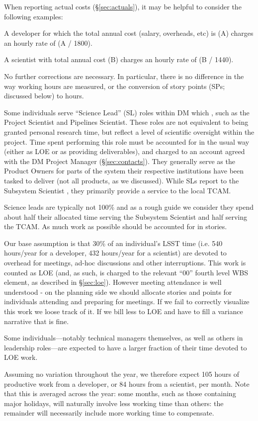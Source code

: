 When reporting actual costs (\S\ref{sec:actuals}), it may
be helpful to consider the following examples:

A developer for which the total annual cost (salary, overheads, etc) is
(A) charges an hourly rate of (A / 1800).

A scientist with total annual cost (B) charges an hourly rate of
(B / 1440).

No further corrections are necessary. In particular, there is no
difference in the way working hours are measured, or the conversion of
story points (SPs; discussed below) to hours.

Some individuals serve ``Science Lead'' (SL) roles within DM which ,
such as the Project Scientist and Pipelines Scientist. These roles are
not equivalent to being granted personal research time, but reflect a
level of scientific oversight within the project. Time spent performing
this role must be accounted for in the usual way (either as LOE or as
providing deliverables), and charged to an account agreed with the
DM Project Manager (\S\ref{sec:contacts}). They generally
serve as the Product Owners for parts of the system their respective
institutions have been tasked to deliver (not all products, as we
discussed). While SLs report to the Subsystem Scientist , they primarily
provide a service to the local TCAM.

Science leads are typically not 100\% and as a rough guide we consider
they spend about half their allocated time serving the Subsystem
Scientist and half serving the TCAM. As much work as possible should be
accounted for in stories.

Our base assumption is that 30\% of an individual's LSST time (i.e. 540
hours/year for a developer, 432 hours/year for a scientist) are devoted
to overhead for meetings, ad-hoc discussions and other interruptions.
This work is counted as LOE (and, as such, is charged to the relevant
``00'' fourth level WBS element, as described
in \S\ref{sec:loe}). However meeting attendance is
well understood - on the planning side we should allocate stories and
points for individuals attending and preparing for meetings. If we fail
to correctly visualize this work we loose track of it. If we bill less
to LOE and have to fill a variance narrative that is fine.

Some individuals---notably technical managers themselves, as well as
others in leadership roles---are expected to have a larger fraction of
their time devoted to LOE work.

Assuming no variation throughout the year, we therefore expect 105 hours
of productive work from a developer, or 84 hours from a scientist, per
month. Note that this is averaged across the year: some months, such as
those containing major holidays, will naturally involve less working
time than others: the remainder will necessarily include more working
time to compensate.

